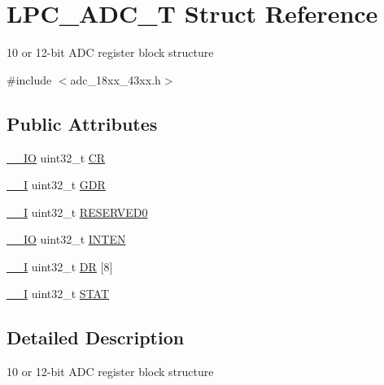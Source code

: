 \hypertarget{struct_l_p_c___a_d_c___t}{}\section{L\+P\+C\+\_\+\+A\+D\+C\+\_\+T Struct Reference}
\label{struct_l_p_c___a_d_c___t}


10 or 12-\/bit A\+DC register block structure  




{\ttfamily \#include $<$adc\+\_\+18xx\+\_\+43xx.\+h$>$}

\subsection*{Public Attributes}
\begin{DoxyCompactItemize}
\item 
\hyperlink{core__sc300_8h_aec43007d9998a0a0e01faede4133d6be}{\+\_\+\+\_\+\+IO} uint32\+\_\+t \hyperlink{struct_l_p_c___a_d_c___t_a751f1cbdd3d5242aea596dc18113fedc}{CR}
\item 
\hyperlink{core__sc300_8h_af63697ed9952cc71e1225efe205f6cd3}{\+\_\+\+\_\+I} uint32\+\_\+t \hyperlink{struct_l_p_c___a_d_c___t_a063e42ec8fcdcf5590579a8d1a888ca0}{G\+DR}
\item 
\hyperlink{core__sc300_8h_af63697ed9952cc71e1225efe205f6cd3}{\+\_\+\+\_\+I} uint32\+\_\+t \hyperlink{struct_l_p_c___a_d_c___t_afeba3e59f72b009dfb03377557ddcd60}{R\+E\+S\+E\+R\+V\+E\+D0}
\item 
\hyperlink{core__sc300_8h_aec43007d9998a0a0e01faede4133d6be}{\+\_\+\+\_\+\+IO} uint32\+\_\+t \hyperlink{struct_l_p_c___a_d_c___t_a3ed883c378f817342d10cb7ed29a05ae}{I\+N\+T\+EN}
\item 
\hyperlink{core__sc300_8h_af63697ed9952cc71e1225efe205f6cd3}{\+\_\+\+\_\+I} uint32\+\_\+t \hyperlink{struct_l_p_c___a_d_c___t_a10f521f172d10766bb189be671f8bd57}{DR} \mbox{[}8\mbox{]}
\item 
\hyperlink{core__sc300_8h_af63697ed9952cc71e1225efe205f6cd3}{\+\_\+\+\_\+I} uint32\+\_\+t \hyperlink{struct_l_p_c___a_d_c___t_a6fd64c9a5717b2adc106721eb9ab190b}{S\+T\+AT}
\end{DoxyCompactItemize}


\subsection{Detailed Description}
10 or 12-\/bit A\+DC register block structure 

